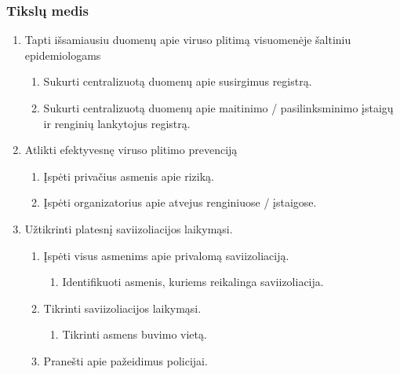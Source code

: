 \documentclass{VUMIFPSkursinis}
\begin{document}
\subsubsection{Tikslų medis}

\begin{enumerate}
	\item Tapti išsamiausiu duomenų apie viruso plitimą visuomenėje šaltiniu epidemiologams
	      \begin{enumerate}
		      \item Sukurti centralizuotą duomenų apie susirgimus registrą.
		      \item Sukurti centralizuotą duomenų apie maitinimo / pasilinksminimo įstaigų ir renginių lankytojus registrą.
	      \end{enumerate}
	\item Atlikti efektyvesnę viruso plitimo prevenciją
	      \begin{enumerate}
		      \item Įspėti privačius asmenis apie riziką.
		      \item Įspėti organizatorius apie atvejus renginiuose / įstaigose.
	      \end{enumerate}
	\item Užtikrinti platesnį saviizoliacijos laikymąsi.
	      \begin{enumerate}
		      \item Įspėti visus asmenims apie privalomą saviizoliaciją.
		            \begin{enumerate}
			            \item Identifikuoti asmenis, kuriems reikalinga saviizoliacija.
		            \end{enumerate}
		      \item Tikrinti saviizoliacijos laikymąsi.
		            \begin{enumerate}
			            \item Tikrinti asmens buvimo vietą.
		            \end{enumerate}
		      \item Pranešti apie pažeidimus policijai.
	      \end{enumerate}
\end{enumerate}
\end{document}
